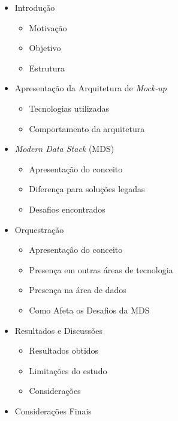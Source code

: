 \begin{itemize}
    \item Introdução
        \begin{itemize}
            \item Motivação
            \item Objetivo
            \item Estrutura
        \end{itemize}
    \item Apresentação da Arquitetura de \textit{Mock-up}
        \begin{itemize}
            \item Tecnologias utilizadas
            \item Comportamento da arquitetura
        \end{itemize}
    \item \textit{Modern Data Stack} (MDS)
        \begin{itemize}
            \item Apresentação do conceito
            \item Diferença para soluções legadas
            \item Desafios encontrados
        \end{itemize}
    \item Orquestração
        \begin{itemize}
            \item Apresentação do conceito
            \item Presença em outras áreas de tecnologia
            \item Presença na área de dados
            \item Como Afeta os Desafios da MDS
        \end{itemize}
    \item Resultados e Discussões
        \begin{itemize}
            \item Resultados obtidos
            \item Limitações do estudo
            \item Considerações
        \end{itemize}
    \item Considerações Finais
\end{itemize}
